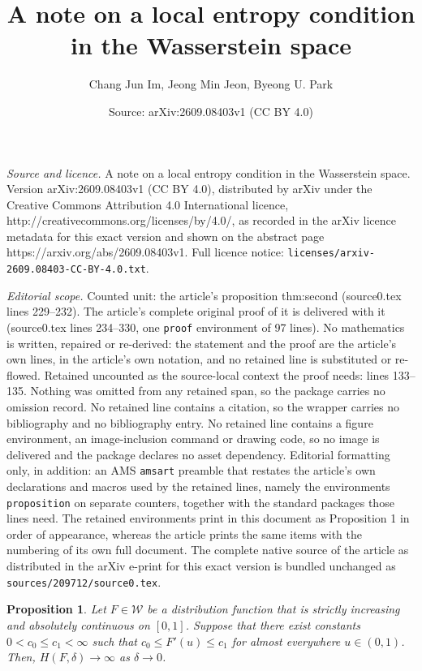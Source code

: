 \documentclass[10pt,a4paper]{amsart}
\title{A note on a local entropy condition in the Wasserstein space}
\author{Chang Jun Im, Jeong Min Jeon, Byeong U. Park}
\date{Source: arXiv:2609.08403v1 (CC BY 4.0)}
\newtheorem{proposition}{Proposition}
\begin{document}
\maketitle

\noindent\emph{Source and licence.} A note on a local entropy condition in the Wasserstein space. Version arXiv:2609.08403v1 (CC BY 4.0), distributed by arXiv under the Creative Commons Attribution 4.0 International licence, http://creativecommons.org/licenses/by/4.0/, as recorded in the arXiv licence metadata for this exact version and shown on the abstract page https://arxiv.org/abs/2609.08403v1. Full licence notice: \texttt{licenses/arxiv-2609.08403-CC-BY-4.0.txt}.\par\smallskip

\noindent\textit{Editorial scope.} Counted unit: the article's proposition thm:second (source0.tex lines 229--232). The article's complete original proof of it is delivered with it (source0.tex lines 234--330, one \texttt{proof} environment of 97 lines). No mathematics is written, repaired or re-derived: the statement and the proof are the article's own lines, in the article's own notation, and no retained line is substituted or re-flowed.  Retained uncounted as the source-local context the proof needs: lines 133--135.  Nothing was omitted from any retained span, so the package carries no omission record.  No retained line contains a citation, so the wrapper carries no bibliography and no bibliography entry.  No retained line contains a figure environment, an image-inclusion command or drawing code, so no image is delivered and the package declares no asset dependency.  Editorial formatting only, in addition: an AMS \texttt{amsart} preamble that restates the article's own declarations and macros used by the retained lines, namely the environments \texttt{proposition} on separate counters, together with the standard packages those lines need.  The retained environments print in this document as Proposition 1 in order of appearance, whereas the article prints the same items with the numbering of its own full document.  The complete native source of the article as distributed in the arXiv e-print for this exact version is bundled unchanged as \texttt{sources/209712/source0.tex}.
\begin{proposition} \label{thm:first}
    Let $F \in \mathcal{W}$ be a distribution function that is strictly increasing and absolutely continuous on $[0,1]$. Suppose that there exist constants \(0<c_0\le c_1<\infty\) such that $c_0\le F'(u)\le c_1$ for almost everywhere $u\in(0,1)$. Then, $H(F,\delta) \to \infty$ as $\delta \to 0$.
\end{proposition}
\end{document}
